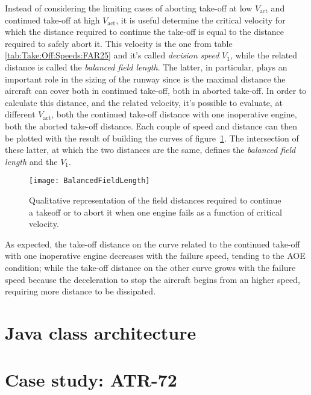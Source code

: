 \bigskip
\noindent
Instead of considering the limiting cases of aborting take-off at low $V_{\text{act}}$ and continued take-off at high $V_{\text{act}}$, it is useful determine the critical velocity for which the distance required to continue the take-off is equal to the distance required to safely abort it. This velocity is the one from table \ref{tab:Take:Off:Speeds:FAR25} and it's called \emph{decision speed} $V_1$, while the related distance is called the \emph{balanced field length}. The latter, in particular, plays an important role in the sizing of the runway since is the maximal distance the aircraft can cover both in continued take-off, both in 
aborted take-off. 
%
In order to calculate this distance, and the related velocity, it's possible to evaluate, at different $V_{\text{act}}$,  both the continued take-off distance with one inoperative engine, both the aborted take-off distance. Each couple of speed and distance can then be plotted with the result of building the curves of figure~\ref{fig:BalancedFieldLength}. The intersection of these latter, at which the two distances are the same, defines the \emph{balanced field length} and the $V_1$.
%
\begin{figure}[H]
\centering
\texttt{[image: BalancedFieldLength]}
\caption{Qualitative representation of the field distances required to continue a takeoff or to abort it when one
engine fails as a function of critical velocity.}
\label{fig:BalancedFieldLength}
\end{figure}
%
\noindent
As expected, the take-off distance on the curve related to the continued take-off with one inoperative engine decreases with the failure speed, tending to the AOE condition; while the take-off distance on the other curve grows with the failure speed because the deceleration to stop the aircraft begins from an higher speed, requiring more distance to be dissipated.
%
\section{Java class architecture}
\section{Case study: ATR-72}